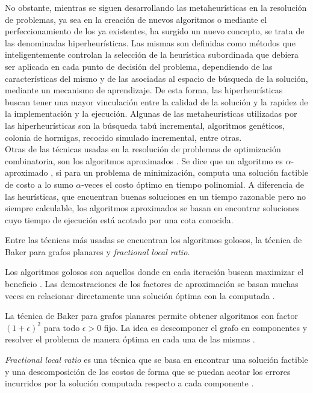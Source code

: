 \documentclass[a4paper,openright,11pt,oneside]{book}
\begin{document}
	No obstante, mientras se siguen desarrollando las metaheurísticas en la resolución de problemas, ya sea en la  creación  de nuevos algoritmos o mediante el perfeccionamiento de los ya existentes, ha surgido un nuevo concepto, se trata de las denominadas hiperheurísticas. Las mismas son definidas como métodos que inteligentemente controlan la selección de la heurística subordinada que debiera ser aplicada en cada punto de decisión del problema, dependiendo de las características del mismo y de las asociadas al espacio de búsqueda de la solución, mediante un mecanismo de aprendizaje. De esta forma, las hiperheurísticas buscan  tener una mayor vinculación entre la calidad de la solución y la rapidez de la implementación y la ejecución. Algunas de las metaheurísticas utilizadas por las hiperheurísticas son  la búsqueda  tabú  incremental, algoritmos genéticos, colonia de hormigas, recocido simulado incremental, entre otras. \\
	
	Otras de las técnicas usadas en la resolución de problemas de optimización combinatoria, son los algoritmos aproximados \cite{vasiliev2018algoritmos}. Se dice que un algoritmo es $\alpha$-aproximado \cite{johnson1974approximation}, si para un problema de minimización, computa una solución factible de costo a lo sumo $\alpha$-veces el costo óptimo en tiempo polinomial. A diferencia de las heurísticas, que encuentran buenas soluciones en un tiempo razonable pero no siempre calculable, los algoritmos aproximados se basan en encontrar soluciones cuyo tiempo de ejecución está acotado por una cota conocida.
	
	Entre las técnicas más usadas se encuentran los algoritmos golosos, la técnica de Baker para grafos planares y \emph{fractional local ratio}.
	
	Los algoritmos golosos son aquellos donde en cada iteración buscan maximizar el beneficio \cite{jungnickel2005graphs}. Las demostraciones de los factores de aproximación se basan muchas veces en relacionar directamente una solución óptima con la computada \cite{vasiliev2018algoritmos}.
	
	La técnica de Baker para grafos planares permite obtener algoritmos con factor $(1+ \epsilon)^2$ para todo $\epsilon > 0$ fijo. La idea es descomponer el grafo en componentes y resolver el problema de manera óptima en cada una de las mismas \cite{vasiliev2018algoritmos}.
	
	\emph{Fractional local ratio} es una técnica que se basa en encontrar una solución factible y una descomposición de los costos de forma que se puedan acotar los errores incurridos por la solución computada respecto a cada componente \cite{vasiliev2018algoritmos}.
	
\end{document}
